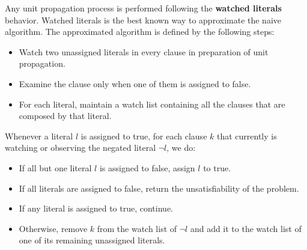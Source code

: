 Any unit propagation process is performed following the \textbf{watched literals} behavior. Watched literals is the best known way to approximate the 
naive algorithm. The approximated algorithm is defined by the following steps:
\begin{itemize}
    \renewcommand{\labelitemi}{-}
    \item Watch two unassigned literals in every clause in preparation of unit propagation.
    \item Examine the clause only when one of them is assigned to false.
    \item For each literal, maintain a watch list containing all the clauses that are composed by that literal.
\end{itemize}
Whenever a literal $l$ is assigned to true, for each clause $k$ that currently is watching or observing the negated literal $\neg l$, we do:
\begin{itemize}
    \renewcommand{\labelitemi}{-}
    \item If all but one literal $l$ is assigned to false, assign $l$ to true.
    \item If all literals are assigned to false, return the unsatisfiability of the problem.
    \item If any literal is assigned to true, continue.
    \item Otherwise, remove $k$ from the watch list of $\neg l$ and add it to the watch list of one of its remaining unassigned literals.
\end{itemize}
